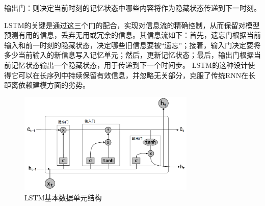 输出门：则决定当前时刻的记忆状态中哪些内容将作为隐藏状态传递到下一时刻。


LSTM的关键是通过这三个门的配合，实现对信息流的精确控制，从而保留对模型预测有用的信息，丢弃无用或冗余的信息。其信息流如下：首先，遗忘门根据当前输入和前一时刻的隐藏状态，决定哪些旧信息要被“遗忘”；接着，输入门决定要将多少当前输入的新信息写入记忆单元；然后，更新记忆状态；最后，输出门根据当前记忆状态输出一个隐藏状态，用于传递到下一个时间步。
LSTM的这种设计使得它可以在长序列中持续保留有效信息，并忽略无关部分，克服了传统RNN在长距离依赖建模方面的劣势。


\begin{figure}[hbt]
	\centering
	\includegraphics[width=0.75\textwidth]{figures/2.5}
	\caption{LSTM基本数据单元结构}\label{fig:2.5}
\end{figure}


